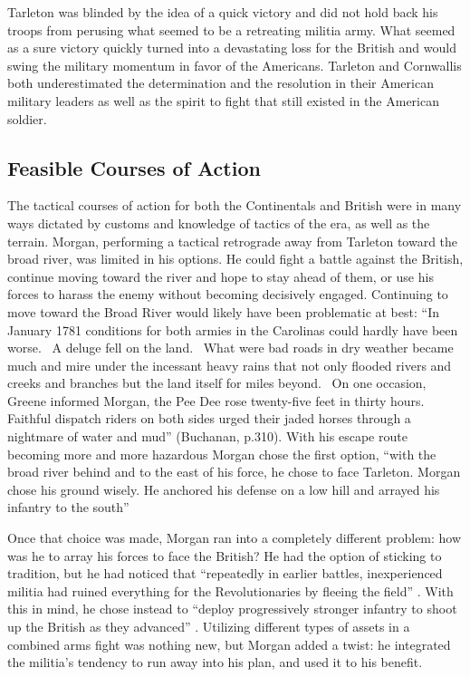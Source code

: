 Tarleton was blinded by the idea of a quick victory and did not hold back his
troops from perusing what seemed to be a retreating militia army. What seemed as
a sure victory quickly turned into a devastating loss for the British and would
swing the military momentum in favor of the Americans. Tarleton and Cornwallis
both underestimated the determination and the resolution in their American
military leaders as well as the spirit to fight that still existed in the
American soldier. 

\subsection{Feasible Courses of Action}

The tactical courses of action for both the Continentals and British were in
many ways dictated by customs and knowledge of tactics of the era, as well as
the terrain.  Morgan, performing a tactical retrograde away from Tarleton toward
the broad river, was limited in his options.  He could fight a battle against
the British, continue moving toward the river and hope to stay ahead of them, or
use his forces to harass the enemy without becoming decisively engaged.
Continuing to move toward the Broad River would likely have been problematic at
best: “In January 1781 conditions for both armies in the Carolinas could hardly
have been worse.  A deluge fell on the land.  What were bad roads in dry weather
became much and mire under the incessant heavy rains that not only flooded
rivers and creeks and branches but the land itself for miles beyond.  On one
occasion, Greene informed Morgan, the Pee Dee rose twenty-five feet in thirty
hours.  Faithful dispatch riders on both sides urged their jaded horses through
a nightmare of water and mud” (Buchanan, p.310).  With his escape route becoming
more and more hazardous Morgan chose the first option, “with the broad river
behind and to the east of his force, he chose to face Tarleton.  Morgan chose
his ground wisely.  He anchored his defense on a low hill and arrayed his
infantry to the south” \cite[32]{brinkley_back_1998}   

Once that choice was made, Morgan ran into a completely different problem: how
was he to array his forces to face the British?  He had the option of sticking
to tradition, but he had noticed that ``repeatedly in earlier battles,
inexperienced militia had ruined everything for the Revolutionaries by fleeing
the field” \cite[30]{weigley_partisan_1970}.  With this in mind, he chose instead to “deploy
progressively stronger infantry to shoot up the British as they advanced”
\cite[71]{babits}.  Utilizing different types of assets in a combined arms fight
was nothing new, but Morgan added a twist: he integrated the militia’s tendency
to run away into his plan, and used it to his benefit.  

